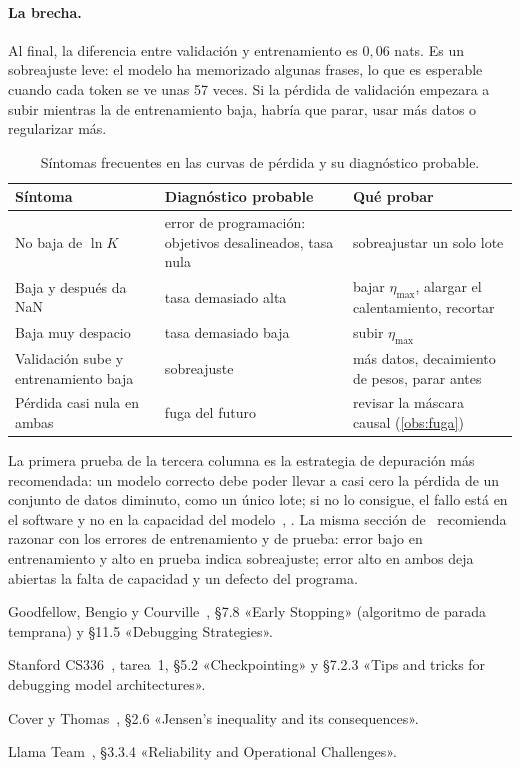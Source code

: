 \paragraph{La brecha.} Al final, la diferencia entre validación y entrenamiento es $0{,}06$ nats. Es un sobreajuste leve: el modelo ha memorizado algunas frases, lo que es esperable cuando cada token se ve unas 57 veces. Si la pérdida de validación empezara a subir mientras la de entrenamiento baja, habría que parar, usar más datos o regularizar más.

\begin{table}[h]
\centering\small
\caption{Síntomas frecuentes en las curvas de pérdida y su diagnóstico probable.}\label{tab:sintomas}
\begin{tabularx}{\textwidth}{@{}>{\raggedright\arraybackslash}X>{\raggedright\arraybackslash}X>{\raggedright\arraybackslash}X@{}}
\toprule
Síntoma & Diagnóstico probable & Qué probar \\
\midrule
No baja de $\ln K$ & error de programación: objetivos desalineados, tasa nula & sobreajustar un solo lote \\
Baja y después da NaN & tasa demasiado alta & bajar $\eta_{\max}$, alargar el calentamiento, recortar \\
Baja muy despacio & tasa demasiado baja & subir $\eta_{\max}$ \\
Validación sube y entrenamiento baja & sobreajuste & más datos, decaimiento de pesos, parar antes \\
Pérdida casi nula en ambas & fuga del futuro & revisar la máscara causal (\cref{obs:fuga}) \\
\bottomrule
\end{tabularx}
\end{table}

La primera prueba de la tercera columna es la estrategia de depuración más recomendada: un modelo correcto debe poder llevar a casi cero la pérdida de un conjunto de datos diminuto, como un único lote; si no lo consigue, el fallo está en el software y no en la capacidad del modelo~\cite[§11.5]{gbc}, \cite[§7.2.3]{cs336}. La misma sección de~\cite{gbc} recomienda razonar con los errores de entrenamiento y de prueba: error bajo en entrenamiento y alto en prueba indica sobreajuste; error alto en ambos deja abiertas la falta de capacidad y un defecto del programa.

\begin{lecturas}
\item Goodfellow, Bengio y Courville~\cite{gbc}, §7.8 «Early Stopping» (algoritmo de parada temprana) y §11.5 «Debugging Strategies».
\item Stanford CS336~\cite{cs336}, tarea~1, §5.2 «Checkpointing» y §7.2.3 «Tips and tricks for debugging model architectures».
\item Cover y Thomas~\cite{ct}, §2.6 «Jensen's inequality and its consequences».
\item Llama Team~\cite{llama3}, §3.3.4 «Reliability and Operational Challenges».
\end{lecturas}

